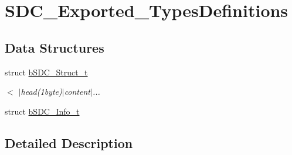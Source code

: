 \hypertarget{group___s_d_c___exported___types_definitions}{}\section{S\+D\+C\+\_\+\+Exported\+\_\+\+Types\+Definitions}
\label{group___s_d_c___exported___types_definitions}
\subsection*{Data Structures}
\begin{DoxyCompactItemize}
\item 
struct \mbox{\hyperlink{structb_s_d_c___struct__t}{b\+S\+D\+C\+\_\+\+Struct\+\_\+t}}
\begin{DoxyCompactList}\small\item\em $<$ $\vert$head(1byte)$\vert$content$\vert$... \end{DoxyCompactList}\item 
struct \mbox{\hyperlink{structb_s_d_c___info__t}{b\+S\+D\+C\+\_\+\+Info\+\_\+t}}
\end{DoxyCompactItemize}


\subsection{Detailed Description}
